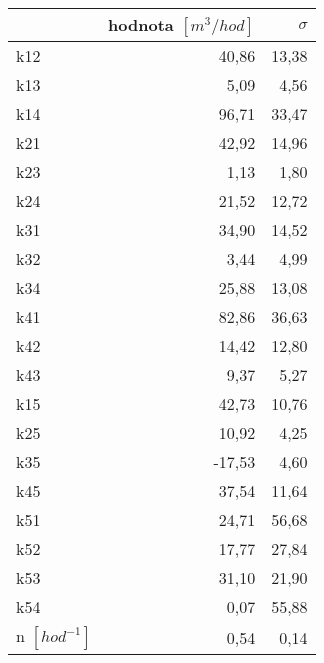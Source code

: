 \begin{tabular}{lrr}
\toprule
{} &  hodnota $\left[\si{m^3/hod}\right]$ &  $\sigma$ \\
\midrule
k12                 &                                40,86 &     13,38 \\
k13                 &                                 5,09 &      4,56 \\
k14                 &                                96,71 &     33,47 \\
k21                 &                                42,92 &     14,96 \\
k23                 &                                 1,13 &      1,80 \\
k24                 &                                21,52 &     12,72 \\
k31                 &                                34,90 &     14,52 \\
k32                 &                                 3,44 &      4,99 \\
k34                 &                                25,88 &     13,08 \\
k41                 &                                82,86 &     36,63 \\
k42                 &                                14,42 &     12,80 \\
k43                 &                                 9,37 &      5,27 \\
k15                 &                                42,73 &     10,76 \\
k25                 &                                10,92 &      4,25 \\
k35                 &                               -17,53 &      4,60 \\
k45                 &                                37,54 &     11,64 \\
k51                 &                                24,71 &     56,68 \\
k52                 &                                17,77 &     27,84 \\
k53                 &                                31,10 &     21,90 \\
k54                 &                                 0,07 &     55,88 \\
n $[\si{hod^{-1}}]$ &                                 0,54 &      0,14 \\
\bottomrule
\end{tabular}
